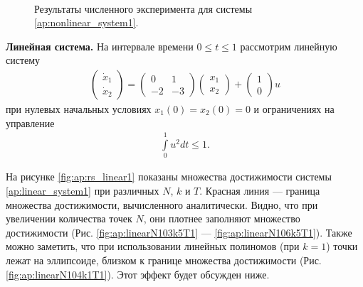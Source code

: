 \documentclass[../main.tex]{subfiles}
\begin{document}
\begin{figure}[ht!]
\begin{minipage}[b]{.3\linewidth}
 	\end{minipage} 
 	\caption{Результаты численного эксперимента для системы \eqref{ap:nonlinear_system1}.}\label{fig:ap:rs_nonlinear1}
 \end{figure}
 
 \textbf{Линейная система.} На интервале времени $ 0 \leqslant t \leqslant 1$ рассмотрим линейную систему 
 \begin{gather}\label{ap:linear_system1}
 	\begin{pmatrix} 
 		\dot{x}_1 \\
 		\dot{x}_2 
 	\end{pmatrix} = 
 	\begin{pmatrix}
 		0 & 1 \\
 		-2 & -3
 	\end{pmatrix}
 	\begin{pmatrix} 
 		x_1 \\
 		x_2 
 	\end{pmatrix} +
 	\begin{pmatrix} 1 \\ 0
 	\end{pmatrix} u
 \end{gather}
 при нулевых начальных условиях $x_1(0) = x_2(0) = 0 $ и ограничениях на управление 
 \begin{gather*}
 	\int\limits_0^1 u^2dt \leqslant 1.
 \end{gather*}
 
 На рисунке \ref{fig:ap:rs_linear1} показаны множества достижимости системы \eqref{ap:linear_system1} при различных $N$, $k$ и $T$.
 Красная линия --- граница множества достижимости, вычисленного аналитически.
 Видно, что при увеличении количества точек $N$, они плотнее заполняют множество достижимости (Рис. \ref{fig:ap:linearN103k5T1} --- \ref{fig:ap:linearN106k5T1}). 
 Также можно заметить, что при использовании линейных полиномов (при $k = 1$) точки лежат на эллипсоиде, близком к границе множества достижимости (Рис. \ref{fig:ap:linearN104k1T1}). 
 Этот эффект будет обсужден ниже.
 
\end{document}
